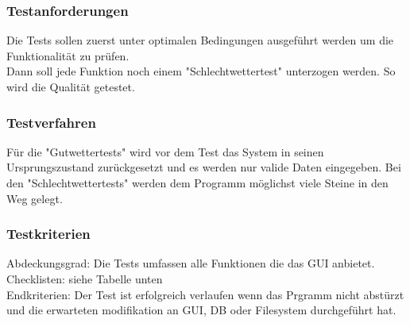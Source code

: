 \documentclass[10pt,paper=a4,final]{scrartcl}
\begin{document}
\subsubsection{Testanforderungen}
Die Tests sollen zuerst unter optimalen Bedingungen ausgeführt werden um die Funktionalität zu prüfen.\\Dann soll jede Funktion noch einem "Schlechtwettertest" unterzogen werden. So wird die Qualität getestet.
\subsubsection{Testverfahren}
Für die "Gutwettertests" wird vor dem Test das System in seinen Ursprungszustand zurückgesetzt und es werden nur valide Daten eingegeben. Bei den "Schlechtwettertests" werden dem Programm möglichst viele Steine in den Weg gelegt.
\subsubsection{Testkriterien}
Abdeckungsgrad: Die Tests umfassen alle Funktionen die das GUI anbietet.\\
Checklisten: siehe Tabelle unten\\
Endkriterien: Der Test ist erfolgreich verlaufen wenn das Prgramm nicht abstürzt und die erwarteten modifikation an GUI, DB oder Filesystem durchgeführt hat.\\
\end{document}
